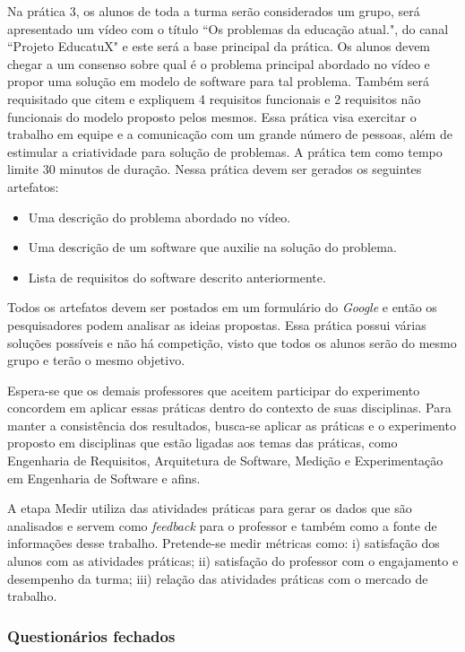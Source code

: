 Na prática 3, os alunos de toda a turma serão considerados um grupo, será apresentado um vídeo com o título ``Os problemas da educação atual.", do canal ``Projeto EducatuX" e este será a base principal da prática. Os alunos devem chegar a um consenso sobre qual é o problema principal abordado no vídeo e propor uma solução em modelo de software para tal problema. Também será requisitado que citem e expliquem 4 requisitos funcionais e 2 requisitos não funcionais do modelo proposto pelos mesmos. Essa prática visa exercitar o trabalho em equipe e a comunicação com um grande número de pessoas, além de estimular a criatividade para solução de problemas. A prática tem como tempo limite 30 minutos de duração. Nessa prática devem ser gerados os seguintes artefatos:
\begin{itemize}\setlength\itemsep{0.5em}
    \item Uma descrição do problema abordado no vídeo.
    \item Uma descrição de um software que auxilie na solução do problema.
    \item Lista de requisitos do software descrito anteriormente.
\end{itemize}
Todos os artefatos devem ser postados em um formulário do \textit{Google} e então os pesquisadores podem analisar as ideias propostas. Essa prática possui várias soluções possíveis e não há competição, visto que todos os alunos serão do mesmo grupo e terão o mesmo objetivo\nocite{VideoPrat3}.

Espera-se que os demais professores que aceitem participar do experimento concordem em aplicar essas práticas dentro do contexto de suas disciplinas. Para manter a consistência dos resultados, busca-se aplicar as práticas e o experimento proposto em disciplinas que estão ligadas aos temas das práticas, como Engenharia de Requisitos, Arquitetura de Software, Medição e Experimentação em Engenharia de Software e afins. 

A etapa Medir utiliza das atividades práticas para gerar os dados que são analisados e servem como \textit{feedback} para o professor e também como a fonte de informações desse trabalho. Pretende-se medir métricas como: i) satisfação dos alunos com as atividades práticas; ii) satisfação do professor com o engajamento e desempenho da turma; iii) relação das atividades práticas com o mercado de trabalho.

\subsubsection{Questionários fechados}

